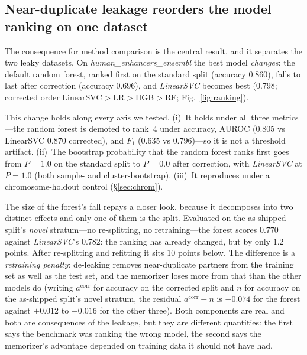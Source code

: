 \documentclass[webpdf,modern,large,namedate]{oup-authoring-template}%
\begin{document}
\subsection{Near-duplicate leakage reorders the model ranking on one dataset}\label{sec:r-rank}
The consequence for method comparison is the central result, and it separates the two leaky datasets. On \textit{human\_enhancers\_ensembl} the best model \emph{changes}: the default random forest, ranked first on the standard split (accuracy $0.860$), falls to last after correction (accuracy $0.696$), and \textit{LinearSVC} becomes best ($0.798$; corrected order LinearSVC$>$LR$>$HGB$>$RF; Fig.~\ref{fig:ranking}). 

This change holds along every axis we tested. (i)~It holds under all three metrics---the random forest is demoted to rank~4 under accuracy, AUROC ($0.805$ vs LinearSVC $0.870$ corrected), and $F_1$ ($0.635$ vs $0.796$)---so it is not a threshold artifact. (ii)~The bootstrap probability that the random forest ranks first goes from $P=1.0$ on the standard split to $P=0.0$ after correction, with \textit{LinearSVC} at $P=1.0$ (both sample- and cluster-bootstrap). (iii)~It reproduces under a chromosome-holdout control (\S\ref{sec:chrom}). 

The size of the forest's fall repays a closer look, because it decomposes into two distinct effects and only one of them is the split. Evaluated on the as-shipped split's \emph{novel} stratum---no re-splitting, no retraining---the forest scores $0.770$ against \textit{LinearSVC}'s $0.782$: the ranking has already changed, but by only $1.2$ points. After re-splitting and refitting it sits $10$ points below. The difference is a \emph{retraining penalty}: de-leaking removes near-duplicate partners from the training set as well as the test set, and the memorizer loses more from that than the other models do (writing $a^{\mathrm{corr}}$ for accuracy on the corrected split and $n$ for accuracy on the as-shipped split's novel stratum, the residual $a^{\mathrm{corr}}-n$ is $-0.074$ for the forest against $+0.012$ to $+0.016$ for the other three). Both components are real and both are consequences of the leakage, but they are different quantities: the first says the benchmark was ranking the wrong model, the second says the memorizer's advantage depended on training data it should not have had.
\end{document}
